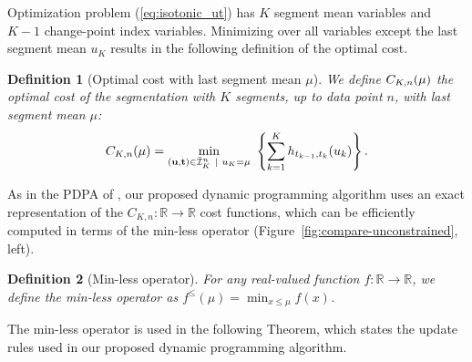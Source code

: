 \documentclass{article}
\newtheorem{definition}{Definition}
\newcommand{\RR}{\mathbb R}
\begin{document}
Optimization problem (\ref{eq:isotonic_ut}) has $K$ segment mean
variables and $K-1$ change-point index variables. Minimizing over all
variables except the last segment mean $u_K$ results in the following
definition of the optimal cost.



\begin{definition}[Optimal cost with last segment mean $\mu$]
\label{def:fcc}
  We define $C_{K,n}(\mu)$ the optimal cost of the segmentation
  with $K$ segments, up to data point $n$, with last segment mean
  $\mu$:
\begin{equation}
C_{K,n}(\mu) = \min_{(\mathbf u, \mathbf t)\in\bar{\mathcal I}^n_K \ | \ u_K = \mu} \
  \left\{ \sum_{k=1}^K
  h_{t_{k-1}, t_k}(u_k) \right\}.
\end{equation}
\end{definition}

As in the PDPA of \citet{pruned-dp}, our proposed dynamic programming
algorithm uses an exact representation of the
$C_{K,n}:\RR\rightarrow\RR$ cost functions, which can be efficiently
computed in terms of the min-less operator (Figure~\ref{fig:compare-unconstrained}, left). 

\begin{definition}[Min-less operator]
For any real-valued
function $f:\RR\rightarrow\RR$, we define the min-less operator as
$f^\leq(\mu)=\min_{x\leq \mu} f(x)$.
\end{definition}

The min-less operator is used in the following Theorem, which states
the update rules used in our proposed dynamic programming algorithm.
\end{document}
